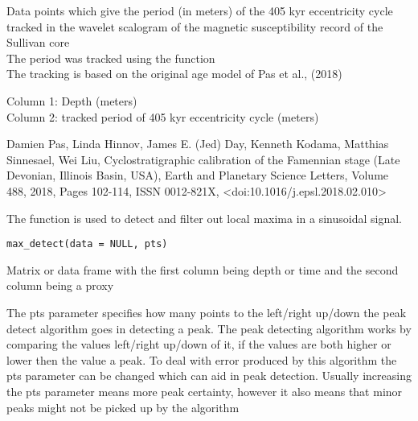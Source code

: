 \documentclass[a4paper]{book}
\begin{document}
%
\begin{Description}
Data points which give the period (in meters) of the 405 kyr eccentricity cycle tracked
in the wavelet scalogram of the magnetic susceptibility record of the Sullivan core \\{}
The period was tracked using the  function\\{}
The tracking is based on the original age model of Pas et al., (2018)\\{}
\end{Description}
%
\begin{Details}
Column 1: Depth (meters)\\{}
Column 2: tracked period of 405 kyr eccentricity cycle (meters)\\{}
\end{Details}
%
\begin{References}
Damien Pas, Linda Hinnov, James E. (Jed) Day, Kenneth Kodama, Matthias Sinnesael, Wei Liu,
Cyclostratigraphic calibration of the Famennian stage (Late Devonian, Illinois Basin, USA),
Earth and Planetary Science Letters,
Volume 488,
2018,
Pages 102-114,
ISSN 0012-821X,
<doi:10.1016/j.epsl.2018.02.010>
\end{References}
%
\begin{Description}
The  function is used
to detect and filter out local maxima in a sinusoidal signal.
\end{Description}
%
\begin{Usage}
\begin{verbatim}
max_detect(data = NULL, pts)
\end{verbatim}
\end{Usage}
%
\begin{Arguments}
\begin{ldescription}
\item[\code{data}] Matrix or data frame with the first column being depth or time
and the second column being a proxy

\item[\code{pts}] The pts parameter specifies how many points to the left/right up/down the peak detect algorithm goes in detecting
a peak. The peak detecting algorithm works by comparing the values left/right up/down of it, if the values are both higher or lower
then the value a peak. To deal with error produced by this algorithm the pts parameter can be changed which can
aid in peak detection. Usually increasing the pts parameter means more peak certainty, however it also means that minor peaks might not be
picked up by the algorithm 
\end{ldescription}
\end{Arguments}
\end{document}
